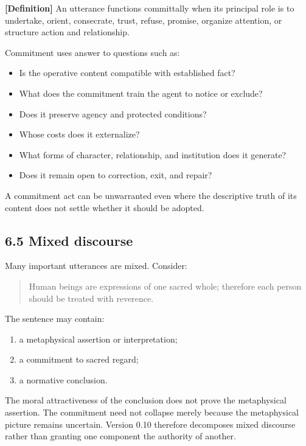\documentclass[
  11pt,
]{article}
\providecommand{\tightlist}{%
  \setlength{\itemsep}{0pt}\setlength{\parskip}{0pt}}
\begin{document}
\textbf{{[}Definition{]}} An utterance functions committally when its
principal role is to undertake, orient, consecrate, trust, refuse,
promise, organize attention, or structure action and relationship.

Commitment uses answer to questions such as:

\begin{itemize}
\tightlist
\item
  Is the operative content compatible with established fact?
\item
  What does the commitment train the agent to notice or exclude?
\item
  Does it preserve agency and protected conditions?
\item
  Whose costs does it externalize?
\item
  What forms of character, relationship, and institution does it
  generate?
\item
  Does it remain open to correction, exit, and repair?
\end{itemize}

A commitment act can be unwarranted even where the descriptive truth of
its content does not settle whether it should be adopted.

\subsection{6.5 Mixed discourse}\label{mixed-discourse}

Many important utterances are mixed. Consider:

\begin{quote}
Human beings are expressions of one sacred whole; therefore each person
should be treated with reverence.
\end{quote}

The sentence may contain:

\begin{enumerate}
\def\labelenumi{\arabic{enumi}.}
\tightlist
\item
  a metaphysical assertion or interpretation;
\item
  a commitment to sacred regard;
\item
  a normative conclusion.
\end{enumerate}

The moral attractiveness of the conclusion does not prove the
metaphysical assertion. The commitment need not collapse merely because
the metaphysical picture remains uncertain. Version 0.10 therefore
decomposes mixed discourse rather than granting one component the
authority of another.
\end{document}
